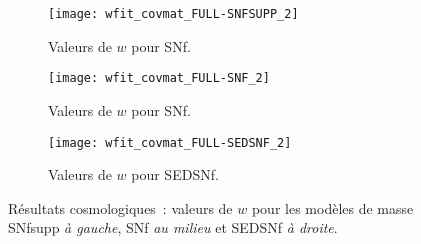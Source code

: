 \documentclass[../main/main.tex]{subfiles}
\begin{document}
\begin{landscape}
\begin{figure}[h!]
    \centerfloat
    \begin{subfigure}[]{.30\linewidth}
        \centering
        \texttt{[image: wfit\_covmat\_FULL-SNFSUPP\_2]}
        \caption[Valeurs de $w$ avec le modèle de masse SNf]{Valeurs de
        $w$ pour SNf.}
        \label{fig:wsnfsupp}
    \end{subfigure}
    \begin{subfigure}[]{.30\linewidth}
        \centering
        \texttt{[image: wfit\_covmat\_FULL-SNF\_2]}
        \caption[Valeurs de $w$ avec le modèle de masse SNf]{Valeurs de
        $w$ pour SNf.}
        \label{fig:wsnf}
    \end{subfigure}
    \begin{subfigure}[]{.30\linewidth}
        \centering
        \texttt{[image: wfit\_covmat\_FULL-SEDSNF\_2]}
        \caption[Valeurs de $w$ avec le modèle de masse SEDSNf]{Valeurs de
        $w$ pour SEDSNf.}
        \label{fig:wsed}
    \end{subfigure}
    \caption[Résultats cosmologiques~: $w$ selon le modèle de
    masse]{Résultats cosmologiques~: valeurs de $w$ pour les modèles de
        masse SNfsupp \textit{à gauche}, SNf \textit{au milieu} et SEDSNf
    \textit{à droite}.}
    \label{fig:wdiff}
\end{figure}
\end{landscape}
\restoregeometry
\end{document}
